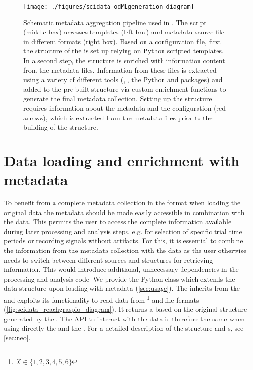 \begin{figure}
 \texttt{[image: ./figures/scidata\_odMLgeneration\_diagram]}
 \caption[Schematic metadata aggregation pipeline used in \citet{Brochier_2018}]{Schematic metadata aggregation pipeline used in \citet{Brochier_2018}. The  script (middle box) accesses  templates (left box) and metadata source file in different formats (right box). Based on a configuration file, first the structure of the  is set up relying on Python scripted  templates. In a second step, the structure is enriched with information content from the metadata files. Information from these files is extracted using a variety of different tools (, , the Python  and  packages) and added to the pre-built  structure via custom enrichment functions to generate the final metadata collection. Setting up the  structure requires information about the metadata and the configuration (red arrows), which is extracted from the metadata files prior to the building of the  structure.}
 \label{fig:scidata_metadata_pipeline}
\end{figure}

\section{Data loading and enrichment with metadata}
\label{sec:data_loading_and_enrichment}
To benefit from a complete metadata collection in the  format when loading the original data the metadata should be made easily accessible in combination with the data. This permits the user to access the complete information available during later processing and analysis steps, e.g. for selection of specific trial time periods or recording signals without artifacts. For this, it is essential to combine the information from the metadata collection with the data as the user otherwise needs to switch between different sources and structures for retrieving information. This would introduce additional, unnecessary dependencies in the processing and analysis code.
We provide the  Python class which extends the  data structure upon loading with metadata (\cref{sec:usage}). The  inherits from the   and exploits its functionality to read data from \footnote{$X \in \{1,2,3,4,5,6\}$} and  file formats (\cref{fig:scidata_reachgraspio_diagram}). It returns a   based on the original structure generated by the  . The API to interact with the data is therefore the same when using directly the   and the . For a detailed description of the  structure and s, see \cref{sec:neo}.

